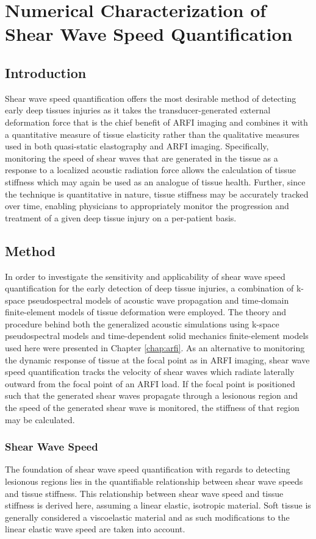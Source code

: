 \chapter{Numerical Characterization of Shear Wave Speed Quantification}
	\label{chap:shear}
	\section{Introduction}
		Shear wave speed quantification offers the most desirable method of detecting early deep tissues injuries as it takes the transducer-generated external deformation force that is the chief benefit of ARFI imaging and combines it with a quantitative measure of tissue elasticity rather than the qualitative measures used in both quasi-static elastography and ARFI imaging. Specifically, monitoring the speed of shear waves that are generated in the tissue as a response to a localized acoustic radiation force allows the calculation of tissue stiffness which may again be used as an analogue of tissue health. Further, since the technique is quantitative in nature, tissue stiffness may be accurately tracked over time, enabling physicians to appropriately monitor the progression and treatment of a given deep tissue injury on a per-patient basis.

	\section{Method}
	\label{sec:shear_method}
		In order to investigate the sensitivity and applicability of shear wave speed quantification for the early detection of deep tissue injuries, a combination of k-space pseudospectral models of acoustic wave propagation and time-domain finite-element models of tissue deformation were employed. The theory and procedure behind both the generalized acoustic simulations using k-space pseudospectral models and time-dependent solid mechanics finite-element models used here were presented in Chapter \ref{chap:arfi}. As an alternative to monitoring the dynamic response of tissue at the focal point as in ARFI imaging, shear wave speed quantification tracks the velocity of shear waves which radiate laterally outward from the focal point of an ARFI load. If the focal point is positioned such that the generated shear waves propagate through a lesionous region and the speed of the generated shear wave is monitored, the stiffness of that region may be calculated.

		\subsection{Shear Wave Speed}
			The foundation of shear wave speed quantification with regards to detecting lesionous regions lies in the quantifiable relationship between shear wave speeds and tissue stiffness. This relationship between shear wave speed and tissue stiffness is derived here, assuming a linear elastic, isotropic material. Soft tissue is generally considered a viscoelastic material and as such modifications to the linear elastic wave speed are taken into account.

